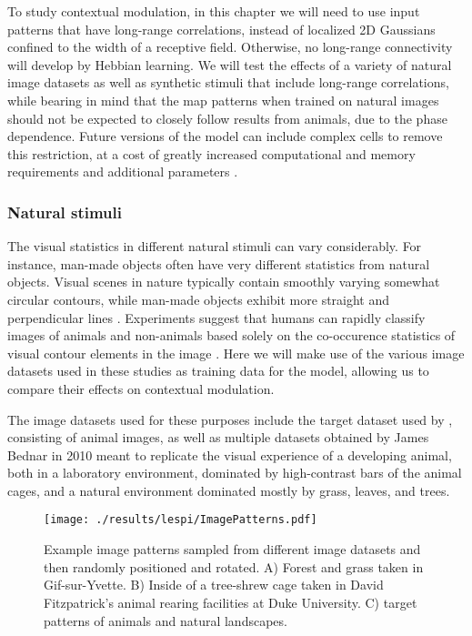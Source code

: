 To study contextual modulation, in this chapter we will need to use
input patterns that have long-range correlations, instead of localized
2D Gaussians confined to the width of a receptive
field.  Otherwise, no long-range connectivity will develop by Hebbian
learning.  We will test the effects of a variety of natural image
datasets as well as synthetic stimuli that include long-range
correlations, while bearing in mind that the map patterns when trained
on natural images should not be expected to closely follow results
from animals, due to the phase dependence.  Future versions of the
model can include complex cells to remove this restriction, at a cost
of greatly increased computational and memory requirements and
additional parameters \citep{Antolik2010}. 

\subsubsection{Natural stimuli}

The visual statistics in different natural stimuli can vary
considerably.  For instance, man-made objects often have very
different statistics from natural objects. Visual scenes in nature
typically contain smoothly varying somewhat circular contours, while
man-made objects exhibit more straight and perpendicular lines
\citep{Perrinet2015}. Experiments suggest that humans can rapidly
classify images of animals and non-animals based solely on the
co-occurence statistics of visual contour elements in the image
\citep{Serre2007, Perrinet2015}. Here we will make use of the various
image datasets used in these studies as training data for the model,
allowing us to compare their effects on contextual modulation.

The image datasets used for these purposes include the target dataset
used by \cite{Serre2007}, consisting of animal images, as well as
multiple datasets obtained by James Bednar in 2010 meant to replicate the
visual experience of a developing animal, both in a laboratory environment,
dominated by high-contrast bars of the animal cages, and a
natural environment dominated mostly by grass, leaves, and trees.

\begin{figure}
	\centering
	\texttt{[image: ./results/lespi/ImagePatterns.pdf]}
	\caption[Example image patterns used to train the model] {Example
      image patterns sampled from different image datasets and then
      randomly positioned and rotated. A) Forest and grass taken in
      Gif-sur-Yvette. B) Inside of a tree-shrew cage taken in David
      Fitzpatrick's animal rearing facilities at Duke University.
      C) \cite{Serre2007} target patterns of animals and natural landscapes.}
    \label{image_patterns}
\end{figure}

